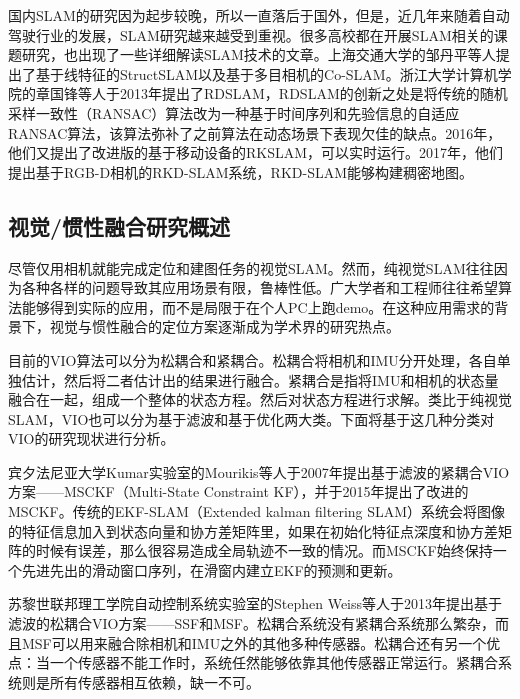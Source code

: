 国内SLAM的研究因为起步较晚，所以一直落后于国外，但是，近几年来随着自动驾驶行业的发展，SLAM研究越来越受到重视。很多高校都在开展SLAM相关的课题研究，也出现了一些详细解读SLAM技术的文章。上海交通大学的邹丹平等人提出了基于线特征的StructSLAM以及基于多目相机的Co-SLAM。浙江大学计算机学院的章国锋等人于2013年提出了RDSLAM，RDSLAM的创新之处是将传统的随机采样一致性（RANSAC）算法改为一种基于时间序列和先验信息的自适应RANSAC算法，该算法弥补了之前算法在动态场景下表现欠佳的缺点。2016年，他们又提出了改进版的基于移动设备的RKSLAM，可以实时运行。2017年，他们提出基于RGB-D相机的RKD-SLAM系统，RKD-SLAM能够构建稠密地图。

\subsection{视觉/惯性融合研究概述}

尽管仅用相机就能完成定位和建图任务的视觉SLAM。然而，纯视觉SLAM往往因为各种各样的问题导致其应用场景有限，鲁棒性低。广大学者和工程师往往希望算法能够得到实际的应用，而不是局限于在个人PC上跑demo。在这种应用需求的背景下，视觉与惯性融合的定位方案逐渐成为学术界的研究热点。

目前的VIO算法可以分为松耦合和紧耦合。松耦合将相机和IMU分开处理，各自单独估计，然后将二者估计出的结果进行融合。紧耦合是指将IMU和相机的状态量融合在一起，组成一个整体的状态方程。然后对状态方程进行求解。类比于纯视觉SLAM，VIO也可以分为基于滤波和基于优化两大类。下面将基于这几种分类对VIO的研究现状进行分析。

宾夕法尼亚大学Kumar实验室的Mourikis等人于2007年提出基于滤波的紧耦合VIO方案——MSCKF（Multi-State Constraint KF），并于2015年提出了改进的MSCKF。传统的EKF-SLAM（Extended kalman filtering SLAM）系统会将图像的特征信息加入到状态向量和协方差矩阵里，如果在初始化特征点深度和协方差矩阵的时候有误差，那么很容易造成全局轨迹不一致的情况。而MSCKF始终保持一个先进先出的滑动窗口序列，在滑窗内建立EKF的预测和更新。

苏黎世联邦理工学院自动控制系统实验室的Stephen Weiss等人于2013年提出基于滤波的松耦合VIO方案——SSF和MSF。松耦合系统没有紧耦合系统那么繁杂，而且MSF可以用来融合除相机和IMU之外的其他多种传感器。松耦合还有另一个优点：当一个传感器不能工作时，系统任然能够依靠其他传感器正常运行。紧耦合系统则是所有传感器相互依赖，缺一不可。

